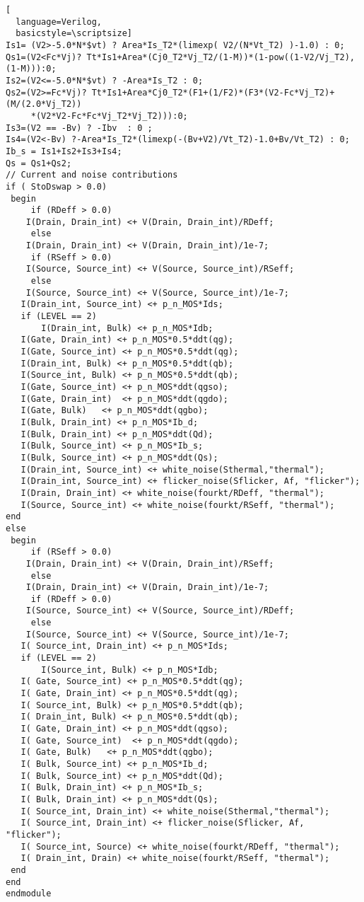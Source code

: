 \begin{lstlisting}[
  language=Verilog,
  basicstyle=\scriptsize]
Is1= (V2>-5.0*N*$vt) ? Area*Is_T2*(limexp( V2/(N*Vt_T2) )-1.0) : 0;
Qs1=(V2<Fc*Vj)? Tt*Is1+Area*(Cj0_T2*Vj_T2/(1-M))*(1-pow((1-V2/Vj_T2),(1-M))):0;
Is2=(V2<=-5.0*N*$vt) ? -Area*Is_T2 : 0;
Qs2=(V2>=Fc*Vj)? Tt*Is1+Area*Cj0_T2*(F1+(1/F2)*(F3*(V2-Fc*Vj_T2)+(M/(2.0*Vj_T2))
     *(V2*V2-Fc*Fc*Vj_T2*Vj_T2))):0;
Is3=(V2 == -Bv) ? -Ibv  : 0 ;
Is4=(V2<-Bv) ?-Area*Is_T2*(limexp(-(Bv+V2)/Vt_T2)-1.0+Bv/Vt_T2) : 0;
Ib_s = Is1+Is2+Is3+Is4;
Qs = Qs1+Qs2;
// Current and noise contributions
if ( StoDswap > 0.0)
 begin
     if (RDeff > 0.0)
	I(Drain, Drain_int) <+ V(Drain, Drain_int)/RDeff;
     else
	I(Drain, Drain_int) <+ V(Drain, Drain_int)/1e-7;
     if (RSeff > 0.0)
	I(Source, Source_int) <+ V(Source, Source_int)/RSeff;
     else
	I(Source, Source_int) <+ V(Source, Source_int)/1e-7;
   I(Drain_int, Source_int) <+ p_n_MOS*Ids;
   if (LEVEL == 2)
       I(Drain_int, Bulk) <+ p_n_MOS*Idb;
   I(Gate, Drain_int) <+ p_n_MOS*0.5*ddt(qg);
   I(Gate, Source_int) <+ p_n_MOS*0.5*ddt(qg);
   I(Drain_int, Bulk) <+ p_n_MOS*0.5*ddt(qb);
   I(Source_int, Bulk) <+ p_n_MOS*0.5*ddt(qb);
   I(Gate, Source_int) <+ p_n_MOS*ddt(qgso);
   I(Gate, Drain_int)  <+ p_n_MOS*ddt(qgdo);
   I(Gate, Bulk)   <+ p_n_MOS*ddt(qgbo);
   I(Bulk, Drain_int) <+ p_n_MOS*Ib_d;
   I(Bulk, Drain_int) <+ p_n_MOS*ddt(Qd);
   I(Bulk, Source_int) <+ p_n_MOS*Ib_s;
   I(Bulk, Source_int) <+ p_n_MOS*ddt(Qs);
   I(Drain_int, Source_int) <+ white_noise(Sthermal,"thermal");
   I(Drain_int, Source_int) <+ flicker_noise(Sflicker, Af, "flicker");
   I(Drain, Drain_int) <+ white_noise(fourkt/RDeff, "thermal");
   I(Source, Source_int) <+ white_noise(fourkt/RSeff, "thermal");
end
else
 begin
     if (RSeff > 0.0)
	I(Drain, Drain_int) <+ V(Drain, Drain_int)/RSeff;
     else
	I(Drain, Drain_int) <+ V(Drain, Drain_int)/1e-7;
     if (RDeff > 0.0)
	I(Source, Source_int) <+ V(Source, Source_int)/RDeff;
     else
	I(Source, Source_int) <+ V(Source, Source_int)/1e-7;
   I( Source_int, Drain_int) <+ p_n_MOS*Ids;
   if (LEVEL == 2)
       I(Source_int, Bulk) <+ p_n_MOS*Idb;
   I( Gate, Source_int) <+ p_n_MOS*0.5*ddt(qg);
   I( Gate, Drain_int) <+ p_n_MOS*0.5*ddt(qg);
   I( Source_int, Bulk) <+ p_n_MOS*0.5*ddt(qb);
   I( Drain_int, Bulk) <+ p_n_MOS*0.5*ddt(qb);
   I( Gate, Drain_int) <+ p_n_MOS*ddt(qgso);
   I( Gate, Source_int)  <+ p_n_MOS*ddt(qgdo);
   I( Gate, Bulk)   <+ p_n_MOS*ddt(qgbo);
   I( Bulk, Source_int) <+ p_n_MOS*Ib_d;
   I( Bulk, Source_int) <+ p_n_MOS*ddt(Qd);
   I( Bulk, Drain_int) <+ p_n_MOS*Ib_s;
   I( Bulk, Drain_int) <+ p_n_MOS*ddt(Qs);
   I( Source_int, Drain_int) <+ white_noise(Sthermal,"thermal");
   I( Source_int, Drain_int) <+ flicker_noise(Sflicker, Af, "flicker");
   I( Source_int, Source) <+ white_noise(fourkt/RDeff, "thermal");
   I( Drain_int, Drain) <+ white_noise(fourkt/RSeff, "thermal");
 end
end
endmodule
\end{lstlisting}

